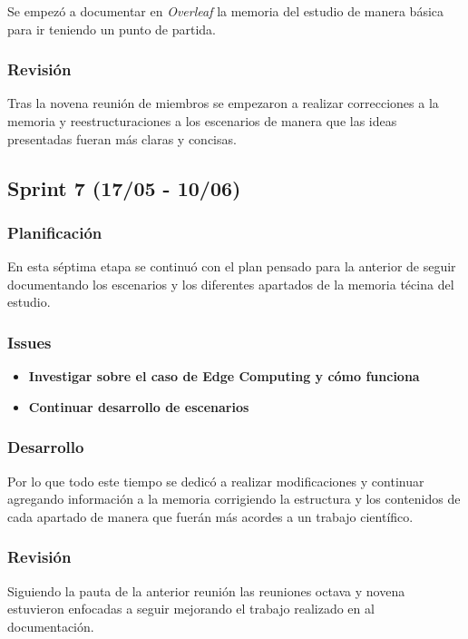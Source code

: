 Se empezó a documentar en \textit{Overleaf}  la memoria del estudio de manera básica para ir teniendo un punto de partida.

\subsubsection{Revisión}
Tras la novena reunión de miembros se empezaron a realizar correcciones a la memoria y reestructuraciones a los escenarios de manera que las ideas presentadas fueran más claras y concisas.

\subsection{Sprint 7 (17/05 - 10/06)}
\subsubsection{Planificación}
En esta séptima etapa se continuó con el plan pensado para la anterior de seguir documentando los escenarios y los diferentes apartados de la memoria técina del estudio.

\subsubsection{Issues}
\begin{itemize}


    \item \textbf{Investigar sobre el caso de Edge Computing y cómo funciona}
    \item \textbf{Continuar desarrollo de escenarios}



\end{itemize}

\subsubsection{Desarrollo}
Por lo que todo este tiempo se dedicó a realizar modificaciones y continuar agregando información a la memoria corrigiendo la estructura y los contenidos de cada apartado de manera que fuerán más acordes a un trabajo científico.

\subsubsection{Revisión}
Siguiendo la pauta de la anterior reunión las reuniones octava y novena estuvieron enfocadas a seguir mejorando el trabajo realizado en al documentación.

